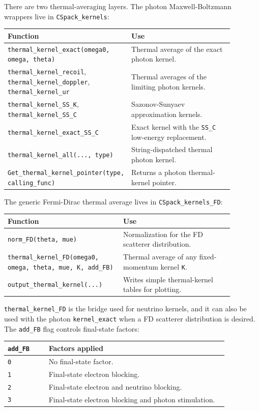 \documentclass[11pt]{article}
\begin{document}
There are two thermal-averaging layers. The photon Maxwell-Boltzmann wrappers
live in \texttt{CSpack\_kernels}:
\begin{center}
\small
\begin{tabular}{L{0.40\linewidth}L{0.48\linewidth}}
\toprule
Function & Use \\
\midrule
\texttt{thermal\_kernel\_exact(omega0, omega, theta)} & Thermal average of the exact photon kernel. \\
\texttt{thermal\_kernel\_recoil}, \texttt{thermal\_kernel\_doppler}, \texttt{thermal\_kernel\_ur} & Thermal averages of the limiting photon kernels. \\
\texttt{thermal\_kernel\_SS\_K}, \texttt{thermal\_kernel\_SS\_C} & Sazonov-Sunyaev approximation kernels. \\
\texttt{thermal\_kernel\_exact\_SS\_C} & Exact kernel with the \texttt{SS\_C} low-energy replacement. \\
\texttt{thermal\_kernel\_all(..., type)} & String-dispatched thermal photon kernel. \\
\texttt{Get\_thermal\_kernel\_pointer(type, calling\_func)} & Returns a photon thermal-kernel pointer. \\
\bottomrule
\end{tabular}
\end{center}

The generic Fermi-Dirac thermal average lives in \texttt{CSpack\_kernels\_FD}:
\begin{center}
\small
\begin{tabular}{L{0.45\linewidth}L{0.43\linewidth}}
\toprule
Function & Use \\
\midrule
\texttt{norm\_FD(theta, mue)} & Normalization for the FD scatterer distribution. \\
\texttt{thermal\_kernel\_FD(omega0, omega, theta, mue, K, add\_FB)} & Thermal average of any fixed-momentum kernel \texttt{K}. \\
\texttt{output\_thermal\_kernel(...)} & Writes simple thermal-kernel tables for plotting. \\
\bottomrule
\end{tabular}
\end{center}

\texttt{thermal\_kernel\_FD} is the bridge used for neutrino kernels, and it
can also be used with the photon \texttt{kernel\_exact} when a FD scatterer
distribution is desired. The \texttt{add\_FB} flag controls final-state factors:
\begin{center}
\small
\begin{tabular}{L{0.16\linewidth}L{0.70\linewidth}}
\toprule
\texttt{add\_FB} & Factors applied \\
\midrule
\texttt{0} & No final-state factor. \\
\texttt{1} & Final-state electron blocking. \\
\texttt{2} & Final-state electron and neutrino blocking. \\
\texttt{3} & Final-state electron blocking and photon stimulation. \\
\bottomrule
\end{tabular}
\end{center}
\end{document}
